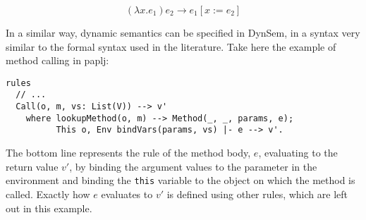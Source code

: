 \begin{equation}
(\lambda x.e_1) e_2 \rightarrow e_1[x := e_2]
\end{equation}

In a similar way, dynamic semantics can be specified in DynSem, in a
syntax very similar to the formal syntax used in the literature. Take
here the example of method calling in paplj:

\begin{verbatim}
rules
  // ...
  Call(o, m, vs: List(V)) --> v'
    where lookupMethod(o, m) --> Method(_, _, params, e);
          This o, Env bindVars(params, vs) |- e --> v'.
\end{verbatim}

The bottom line represents the rule of the method body, \(e\),
evaluating to the return value \(v'\), by binding the argument values to
the parameter in the environment and binding the \texttt{this} variable to
the object on which the method is called. Exactly how \(e\) evaluates to
\(v'\) is defined using other rules, which are left out in this example.
